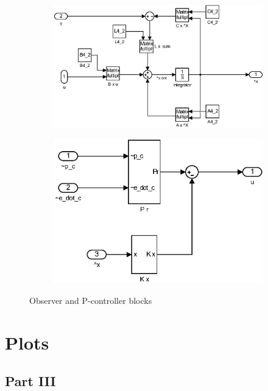 \begin{figure}[H]
\graphicspath{ {Part4_pictures/}}
\begin{subfigure}{0.5\textwidth}
    \includegraphics[width=1\linewidth]{Part4_pictures/simulink/p4p2_obs.eps} 
\end{subfigure}
\begin{subfigure}{0.5\textwidth}
    \includegraphics[width=0.9\linewidth]{Part4_pictures/simulink/p4p2_p.eps}
\end{subfigure}
\caption{Observer and P-controller blocks}
\label{p4p2_obsctr}
\end{figure}
\newpage



\section{Plots}

\subsection{Part III}
